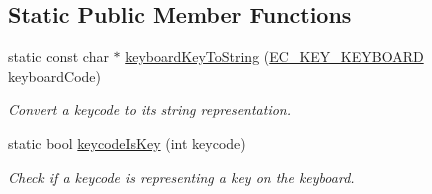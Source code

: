 \subsection*{Static Public Member Functions}
\begin{DoxyCompactItemize}
\item 
static const char $\ast$ \mbox{\hyperlink{classec_1_1_keyboard_a5e986024ce4790af20b3198abce9b807}{keyboard\+Key\+To\+String}} (\mbox{\hyperlink{classec_1_1_keyboard_a135ca08df15aebf8c93ce3cc76288a6e}{E\+C\+\_\+\+K\+E\+Y\+\_\+\+K\+E\+Y\+B\+O\+A\+RD}} keyboard\+Code)
\begin{DoxyCompactList}\small\item\em Convert a keycode to its string representation. \end{DoxyCompactList}\item 
static bool \mbox{\hyperlink{classec_1_1_keyboard_a8d048694060edbbb3cd6dba19d7eff24}{keycode\+Is\+Key}} (int keycode)
\begin{DoxyCompactList}\small\item\em Check if a keycode is representing a key on the keyboard. \end{DoxyCompactList}\end{DoxyCompactItemize}
